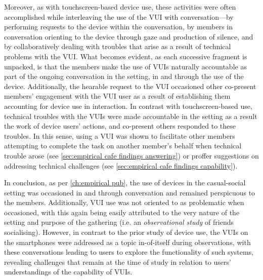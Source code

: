 \begin{revisedsubmission}
Moreover, as with touchscreen-based device use, these activities were often accomplished while interleaving the use of the \ac{VUI} with conversation---by performing requests to the device within the conversation, by members in conversation orienting to the device through gaze and production of silence, and by collaboratively dealing with troubles that arise as a result of technical problems with the \ac{VUI}.
What becomes evident, as each successive fragment is unpacked, is that the members make the use of \acp{VUI} naturally accountable as part of the ongoing conversation in the setting, in and through the use of the device.
Additionally, the hearable request to the \ac{VUI} occasioned other co-present members' engagement with the \ac{VUI} user as a result of establishing them accounting for device use in interaction.
In contrast with touchscreen-based use, technical troubles with the \acp{VUI} were made accountable in the setting as a result the work of device users' actions, and co-present others responded to these troubles.
In this sense, using a \ac{VUI} was shown to facilitate other members attempting to complete the task on another member's behalf when technical trouble arose (see \ref{sec:empirical cafe findings answering}) or proffer suggestions on addressing technical challenges (see \ref{sec:empirical cafe findings capability}).

In conclusion, as per \autoref{ch:empirical pub}, the use of devices in the casual-social setting was occasioned in and through conversation and remained perspicuous to the members.
Additionally, \ac{VUI} use was not oriented to as problematic when occasioned, with this again being easily attributed to the very nature of the setting and purpose of the gathering (i.e. an \textit{observational study} of friends socialising).
However, in contrast to the prior study of device use, the \acp{VUI} on the smartphones were addressed as a topic in-of-itself during observations, with these conversations leading to users to explore the functionality of such systems, revealing challenges that remain at the time of study in relation to users' understandings of the capability of \acp{VUI}.



\end{revisedsubmission}
